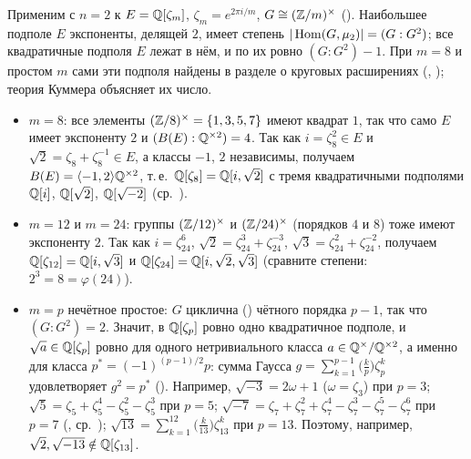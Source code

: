 \begin{example}
Применим  с $n=2$ к $E=\mathbb Q[\zeta_m]$, $\zeta_m=e^{2\pi i/m}$, $G\cong(\mathbb Z/m)^\times$ (). Наибольшее подполе $E$
экспоненты, делящей $2$, имеет степень $|\operatorname{Hom}(G,\mu_2)|=(G:G^2)$; все квадратичные подполя $E$ лежат в нём, и по  их
ровно $(G:G^2)-1$. При $m=8$ и простом $m$ сами эти подполя найдены в разделе о круговых расширениях (, );
теория Куммера объясняет их число.
\begin{itemize}[leftmargin=*]
\item $m=8$: все элементы $(\mathbb Z/8)^\times=\{1,3,5,7\}$ имеют квадрат $1$, так что само $E$ имеет экспоненту $2$ и
$(B(E):\mathbb Q^{\times2})=4$. Так как $i=\zeta_8^2\in E$ и $\sqrt2=\zeta_8+\zeta_8^{-1}\in E$, а классы $-1$, $2$ независимы,
получаем $B(E)=\langle-1,2\rangle\mathbb Q^{\times2}$, т.\,е.\ $\mathbb Q[\zeta_8]=\mathbb Q[i,\sqrt2]$ с тремя квадратичными подполями
$\mathbb Q[i]$, $\mathbb Q[\sqrt2]$, $\mathbb Q[\sqrt{-2}]$ (ср.\ ).
\item $m=12$ и $m=24$: группы $(\mathbb Z/12)^\times$ и $(\mathbb Z/24)^\times$ (порядков $4$ и $8$) тоже имеют экспоненту $2$. Так как
$i=\zeta_{24}^6$, $\sqrt2=\zeta_{24}^3+\zeta_{24}^{-3}$, $\sqrt3=\zeta_{24}^2+\zeta_{24}^{-2}$, получаем
$\mathbb Q[\zeta_{12}]=\mathbb Q[i,\sqrt3]$ и $\mathbb Q[\zeta_{24}]=\mathbb Q[i,\sqrt2,\sqrt3]$ (сравните степени: $2^3=8=\varphi(24)$).
\item $m=p$ нечётное простое: $G$ циклична () чётного порядка $p-1$, так что $(G:G^2)=2$. Значит, в $\mathbb Q[\zeta_p]$
ровно одно квадратичное подполе, и $\sqrt a\in\mathbb Q[\zeta_p]$ ровно для одного нетривиального класса
$a\in\mathbb Q^\times/\mathbb Q^{\times2}$, а именно для класса $p^*=(-1)^{(p-1)/2}p$: сумма Гаусса
$g=\sum_{k=1}^{p-1}\bigl(\frac kp\bigr)\zeta_p^k$ удовлетворяет $g^2=p^*$ (). Например, $\sqrt{-3}=2\omega+1$
($\omega=\zeta_3$) при $p=3$; $\sqrt5=\zeta_5+\zeta_5^4-\zeta_5^2-\zeta_5^3$ при $p=5$;
$\sqrt{-7}=\zeta_7+\zeta_7^2+\zeta_7^4-\zeta_7^3-\zeta_7^5-\zeta_7^6$ при $p=7$ (, ср.\ );
$\sqrt{13}=\sum_{k=1}^{12}\bigl(\frac k{13}\bigr)\zeta_{13}^k$ при $p=13$. Поэтому, например,
$\sqrt2,\sqrt{-13}\notin\mathbb Q[\zeta_{13}]$.
\end{itemize}
\end{example}

